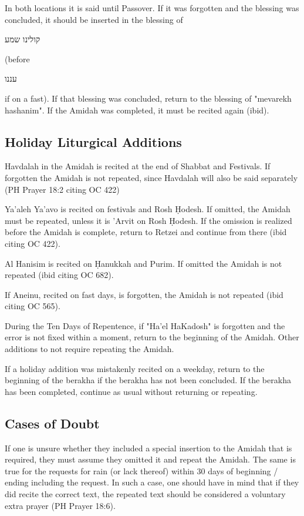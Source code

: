 \documentclass[11pt]{article}
\newcommand{\hebword}[1]{‎\begin{hebrew}\beginR #1 \endR\end{hebrew}}
\begin{document}
In both locations it is said until Passover. If it was forgotten and the blessing was concluded, it should be inserted in the blessing of \hebword{קולינו שמע} (before \hebword{עננו} if on a fast). If that blessing was concluded, return to the blessing of "mevarekh hashanim".  If the Amidah was completed, it must be recited again (ibid).

\subsection{Holiday Liturgical Additions}

Havdalah in the Amidah is recited at the end of Shabbat and Festivals.  If forgotten the Amidah is not repeated, since Havdalah will also be said separately (PH Prayer 18:2 citing OC 422)

Ya'aleh Ya'avo is recited on festivals and Rosh \d{H}odesh.  If omitted, the Amidah must be repeated, unless it is 'Arvit on Rosh \d{H}odesh.  If the omission is realized before the Amidah is complete, return to Retzei and continue from there (ibid citing OC 422).

Al Hanisim is recited on \d{H}anukkah and Purim.  If omitted the Amidah is not repeated (ibid citing OC 682).

If Aneinu, recited on fast days, is forgotten, the Amidah is not repeated (ibid citing OC 565).

During the Ten Days of Repentence, if "Ha'el HaKadosh" is forgotten and the error is not fixed within a moment, return to the beginning of the Amidah.  Other additions to not require repeating the Amidah.

If a holiday addition was mistakenly recited on a weekday, return to the beginning of the berakha if the berakha has not been concluded.  If the berakha has been completed, continue as usual without returning or repeating.

\subsection{Cases of Doubt}

If one is unsure whether they included a special insertion to the Amidah that is required, they must assume they omitted it and repeat the Amidah.  The same is true for the requests for rain (or lack thereof) within 30 days of beginning / ending including the request.  In such a case, one should have in mind that if they did recite the correct text, the repeated text should be considered a voluntary extra prayer (PH Prayer 18:6).
\end{document}

